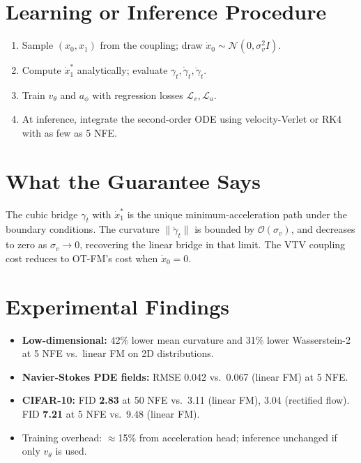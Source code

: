 \documentclass[10pt,twocolumn]{article}
\begin{document}
\section{Learning or Inference Procedure}

\begin{enumerate}[itemsep=2pt,parsep=0pt]
  \item Sample $(x_0, x_1)$ from the coupling; draw $\dot{x}_0 \sim \mathcal{N}(0,\sigma_v^2 I)$.
  \item Compute $\dot{x}_1^*$ analytically; evaluate $\gamma_t,\dot\gamma_t,\ddot\gamma_t$.
  \item Train $v_\theta$ and $a_\phi$ with regression losses $\mathcal{L}_v,\mathcal{L}_a$.
  \item At inference, integrate the second-order ODE using velocity-Verlet or
    RK4 with as few as 5 NFE.
\end{enumerate}

\section{What the Guarantee Says}

The cubic bridge $\gamma_t$ with $\dot{x}_1^*$ is the unique minimum-acceleration
path under the boundary conditions. The curvature $\|\ddot\gamma_t\|$ is bounded
by $\mathcal{O}(\sigma_v)$, and decreases to zero as $\sigma_v \to 0$, recovering
the linear bridge in that limit. The VTV coupling cost reduces to OT-FM's cost
when $\dot{x}_0{=}0$.

\section{Experimental Findings}

\begin{itemize}[itemsep=2pt,parsep=0pt]
  \item \textbf{Low-dimensional:} 42\% lower mean curvature and 31\% lower
    Wasserstein-2 at 5 NFE vs.\ linear FM on 2D distributions.
  \item \textbf{Navier-Stokes PDE fields:} RMSE 0.042 vs.\ 0.067 (linear FM)
    at 5 NFE.
  \item \textbf{CIFAR-10:} FID \textbf{2.83} at 50 NFE vs.\ 3.11 (linear FM),
    3.04 (rectified flow). FID \textbf{7.21} at 5 NFE vs.\ 9.48 (linear FM).
  \item Training overhead: $\approx$15\% from acceleration head; inference
    unchanged if only $v_\theta$ is used.
\end{itemize}
\end{document}
